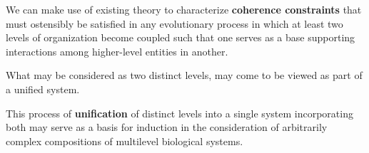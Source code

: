 \begin{frame}
\begin{block}{}
We can make use of existing theory to characterize \textbf{coherence constraints} that must ostensibly be satisfied in any evolutionary process in which at least two levels of organization become coupled such that one serves as a base supporting interactions among higher-level entities in another. 
\end{block}
\begin{block}{}
What may be considered as two distinct levels, may come to be viewed as part of a unified system.
\end{block}
\begin{block}{}
This process of \textbf{unification} of distinct levels into a single system incorporating both may serve as a basis for induction in the consideration of arbitrarily complex compositions of multilevel biological systems.
\end{block}
\end{frame}